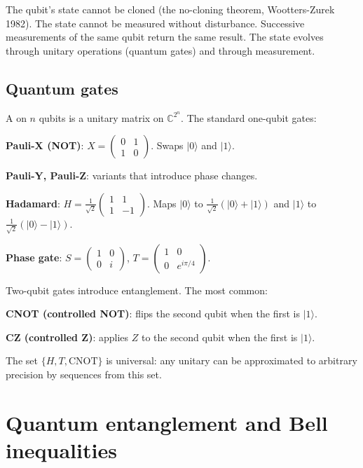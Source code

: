 The qubit's state cannot be cloned (the no-cloning theorem, Wootters-Zurek 1982). The state cannot be measured without disturbance. Successive measurements of the same qubit return the same result. The state evolves through unitary operations (quantum gates) and through measurement.

\subsection{Quantum gates}

A  on $n$ qubits is a unitary matrix on $\mathbb{C}^{2^n}$. The standard one-qubit gates:

\textbf{Pauli-X (NOT)}: $X = \begin{pmatrix} 0 & 1 \\ 1 & 0 \end{pmatrix}$. Swaps $|0\rangle$ and $|1\rangle$.

\textbf{Pauli-Y, Pauli-Z}: variants that introduce phase changes.

\textbf{Hadamard}: $H = \frac{1}{\sqrt{2}} \begin{pmatrix} 1 & 1 \\ 1 & -1 \end{pmatrix}$. Maps $|0\rangle$ to $\frac{1}{\sqrt{2}}(|0\rangle + |1\rangle)$ and $|1\rangle$ to $\frac{1}{\sqrt{2}}(|0\rangle - |1\rangle)$.

\textbf{Phase gate}: $S = \begin{pmatrix} 1 & 0 \\ 0 & i \end{pmatrix}$, $T = \begin{pmatrix} 1 & 0 \\ 0 & e^{i\pi/4} \end{pmatrix}$.

Two-qubit gates introduce entanglement. The most common:

\textbf{CNOT (controlled NOT)}: flips the second qubit when the first is $|1\rangle$.

\textbf{CZ (controlled Z)}: applies $Z$ to the second qubit when the first is $|1\rangle$.

The set $\{H, T, \text{CNOT}\}$ is universal: any unitary can be approximated to arbitrary precision by sequences from this set.

\section{Quantum entanglement and Bell inequalities}

